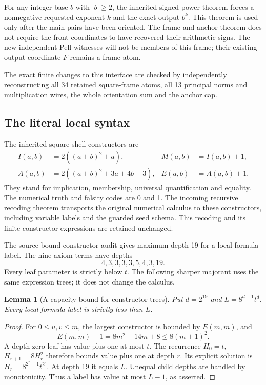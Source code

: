 \documentclass[11pt,a4paper]{article}
\newtheorem{lemma}[theorem]{Lemma}
\theoremstyle{remark}\newtheorem{remark}[theorem]{Remark}
\begin{document}
For any integer base $b$ with $|b|\ge2$, the inherited signed power theorem
forces a nonnegative requested exponent $k$ and the exact output $b^k$.
This theorem is used only after the main pairs have been oriented. The frame
and anchor theorem does not require the front coordinates to have recovered
their arithmetic signs. The new independent Pell witnesses will not be
members of this frame; their existing output coordinate $F$ remains a frame
atom.

The exact finite changes to this interface are checked by independently
reconstructing all 34 retained square-frame atoms, all 13 principal norms and
multiplication wires, the whole orientation sum and the anchor cap.

\subsection{The literal local syntax}

The inherited square-shell constructors are
\begin{align*}
I(a,b)&=2((a+b)^2+a),&M(a,b)&=I(a,b)+1,\\
A(a,b)&=2((a+b)^2+3a+4b+3),&E(a,b)&=A(a,b)+1.
\end{align*}
They stand for implication, membership, universal quantification and equality.
The numerical truth and falsity codes are 0 and 1. The incoming recursive
recoding theorem transports the original numerical calculus to these
constructors, including variable labels and the guarded seed schema. This
recoding and its finite constructor expressions are retained unchanged.

The source-bound constructor audit gives maximum depth 19 for a local formula
label. The nine axiom terms have depths
\[
4,3,3,3,3,5,4,3,19.
\]
Every leaf parameter is strictly below $t$. The following sharper majorant
uses the same expression trees; it does not change the calculus.

\begin{lemma}[A capacity bound for constructor trees]\label{lem:capacity}
Put $d=2^{19}$ and $L=8^{d-1}t^d$. Every local formula label is strictly
less than $L$.
\end{lemma}
\begin{proof}
For $0\le u,v\le m$, the largest constructor is bounded by $E(m,m)$, and
\[
E(m,m)+1=8m^2+14m+8\le8(m+1)^2.
\]
A depth-zero leaf has value plus one at most $t$. The recurrence
$H_0=t$, $H_{r+1}=8H_r^2$ therefore bounds value plus one at depth $r$.
Its explicit solution is $H_r=8^{2^r-1}t^{2^r}$. At depth 19 it equals
$L$. Unequal child depths are handled by monotonicity. Thus a label has value
at most $L-1$, as asserted.
\end{proof}
\end{document}
